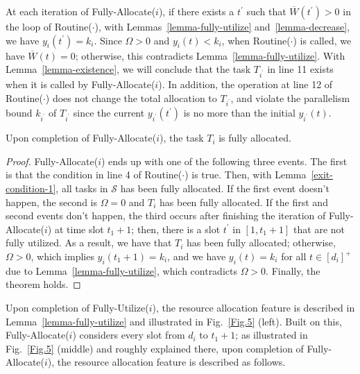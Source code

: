 \documentclass[10pt,journal,compsoc]{IEEEtran}
\begin{document}
At each iteration of Fully-Allocate($i$), if there exists a $t^{\prime}$ such that $\overline{W}(t^{\prime})>0$ in the loop of Routine($\cdot$), with Lemmas~\ref{lemma-fully-utilize} and~\ref{lemma-decrease}, we have $y_{i}(t^{\prime})=k_{i}$. Since $\Omega>0$ and $y_{i}(t) < k_{i}$, when Routine($\cdot$) is called, we have $\overline{W}(t)=0$; otherwise, this contradicts Lemma~\ref{lemma-fully-utilize}. With Lemma~\ref{lemma-existence}, we will conclude that the task $T_{i^{\prime}}$ in line 11 exists when it is called by Fully-Allocate($i$). In addition, the operation at line 12 of Routine($\cdot$) does not change the total allocation to $T_{i^{\prime}}$, and violate the parallelism bound $k_{i^{\prime}}$ of $T_{i^{\prime}}$ since the current $y_{i^{\prime}}(t^{\prime})$ is no more than the initial $y_{i^{\prime}}(t)$.

\begin{proposition}\label{proposi-fully-allocate}
Upon completion of Fully-Allocate($i$), the task $T_{i}$ is fully allocated.
\end{proposition}
\begin{proof}
Fully-Allocate($i$) ends up with one of the following three events. The first is that the condition in line 4 of Routine($\cdot$) is true. Then, with Lemma~\ref{exit-condition-1}, all tasks in $\mathcal{S}$ has been fully allocated. If the first event doesn't happen, the second is $\Omega=0$ and $T_{i}$ has been fully allocated. If the first and second events don't happen, the third occurs after finishing the iteration of Fully-Allocate($i$) at time slot $t_{1}+1$; then, there is a slot $t^{\prime}$ in $[1, t_{1}+1]$ that are not fully utilized. As a result, we have that $T_{i}$ has been fully allocated; otherwise, $\Omega>0$, which implies $y_{i}(t_{1}+1)=k_{i}$, and we have $y_{i}(t)=k_{i}$ for all $t\in[d_{i}]^{+}$ due to Lemma~\ref{lemma-fully-utilize}, which contradicts $\Omega>0$. Finally, the theorem holds.
\end{proof}



Upon completion of Fully-Utilize($i$), the resource allocation feature is described in Lemma~\ref{lemma-fully-utilize} and illustrated in Fig.~\ref{Fig.5} (left). Built on this, Fully-Allocate($i$) considers every slot from $d_{i}$ to $t_{1}+1$; as illustrated in Fig.~\ref{Fig.5} (middle) and roughly explained there, upon completion of Fully-Allocate($i$), the resource allocation feature is described as follows.
\end{document}
